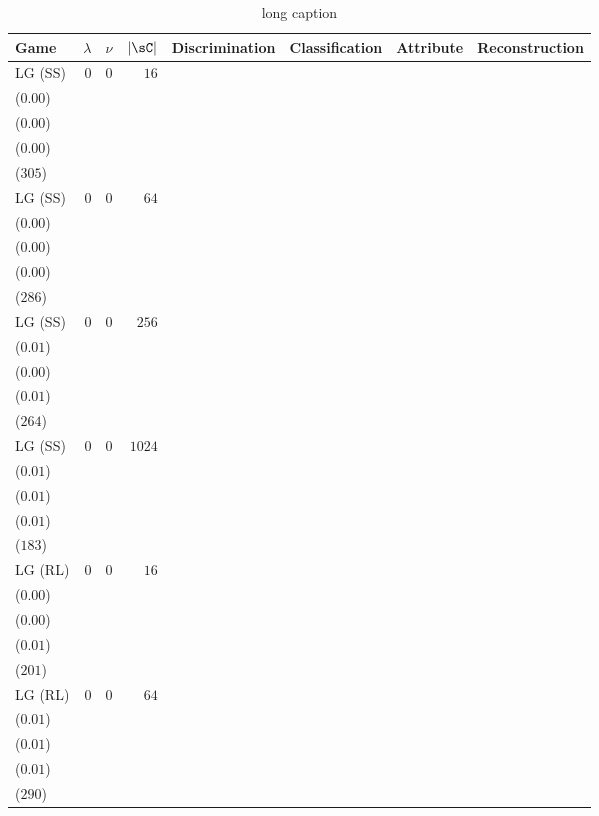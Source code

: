 \begin{table}[t]
\centering
\caption[short caption]{long caption}
\label{table:etl_celeba_075_train}
\begin{tabular}{lrrrrrrr}
\toprule
Game & \(\lambda\) & \(\nu\) & \(|\mathcal{\sC}|\) & \multicolumn{1}{c}{Discrimination} & \multicolumn{1}{c}{Classification} & \multicolumn{1}{c}{Attribute} & \multicolumn{1}{c}{Reconstruction} \\[1ex]
\midrule
LG {\scriptsize(SS)} & \(0\) & \(0\) & \(16\) & \longcell{\(0.01\)\\{\tiny(\(0.00\))}} & \longcell{\(0.00\)\\{\tiny(\(0.00\))}} & \longcell{\(0.83\)\\{\tiny(\(0.00\))}} & \longcell{\(6397\)\\{\tiny(\(305\))}} \\[2.2ex]
LG {\scriptsize(SS)} & \(0\) & \(0\) & \(64\) & \longcell{\(0.02\)\\{\tiny(\(0.00\))}} & \longcell{\(0.00\)\\{\tiny(\(0.00\))}} & \longcell{\(0.83\)\\{\tiny(\(0.00\))}} & \longcell{\(6336\)\\{\tiny(\(286\))}} \\[2.2ex]
LG {\scriptsize(SS)} & \(0\) & \(0\) & \(256\) & \longcell{\(0.03\)\\{\tiny(\(0.01\))}} & \longcell{\(0.00\)\\{\tiny(\(0.00\))}} & \longcell{\(0.83\)\\{\tiny(\(0.01\))}} & \longcell{\(6076\)\\{\tiny(\(264\))}} \\[2.2ex]
LG {\scriptsize(SS)} & \(0\) & \(0\) & \(1024\) & \longcell{\(0.03\)\\{\tiny(\(0.01\))}} & \longcell{\(0.00\)\\{\tiny(\(0.01\))}} & \longcell{\(0.83\)\\{\tiny(\(0.01\))}} & \longcell{\(6160\)\\{\tiny(\(183\))}} \\[2.2ex]
LG {\scriptsize(RL)} & \(0\) & \(0\) & \(16\) & \longcell{\(0.02\)\\{\tiny(\(0.00\))}} & \longcell{\(0.00\)\\{\tiny(\(0.00\))}} & \longcell{\(0.84\)\\{\tiny(\(0.01\))}} & \longcell{\(6217\)\\{\tiny(\(201\))}} \\[2.2ex]
LG {\scriptsize(RL)} & \(0\) & \(0\) & \(64\) & \longcell{\(0.04\)\\{\tiny(\(0.01\))}} & \longcell{\(0.00\)\\{\tiny(\(0.01\))}} & \longcell{\(0.84\)\\{\tiny(\(0.01\))}} & \longcell{\(6125\)\\{\tiny(\(290\))}} \\[2.2ex]

\end{tabular}
\end{table}
